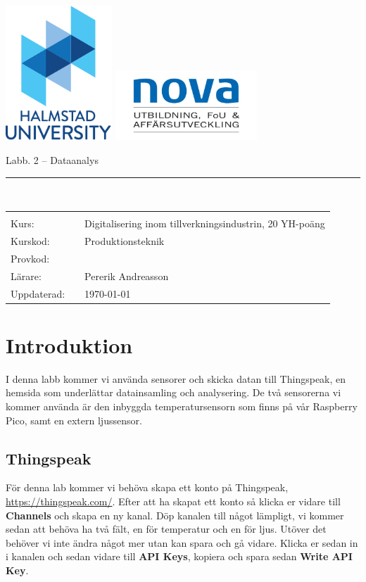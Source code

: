 \documentclass{article}
\newcommand{\kursnamn}{Digitalisering inom tillverknings\-industrin, 20 YH-poäng}
\newcommand{\kurskod}{Produktionsteknik}
\newcommand{\provkod}{}
\begin{document}
  \includegraphics[width=0.3\textwidth]{figures/HH_ENG_color_small.pdf}
  \hspace{3cm}
  \includegraphics[width=0.4\textwidth]{figures/novalogga.jpg}

  \vspace{5mm}
	\begin{center}
	{\Huge{}Labb. 2 -- Dataanalys}
	\end{center}
\noindent\rule{\textwidth}{2pt}
\\


{\Large

\begin{tabular}{p{2cm}p{1cm}p{8cm}}
&  &  \\
Kurs: & 	& 	\kursnamn \\
Kurskod: & & \kurskod \\
Provkod: &  & \provkod \\
L\"arare: &  & Pererik Andreasson \\
Uppdaterad: & & \today
\end{tabular}

}
\pagebreak

\tableofcontents

\section{Introduktion}
I denna labb kommer vi använda sensorer och skicka datan till Thingspeak, en hemsida som underlättar datainsamling och analysering. De två sensorerna vi kommer använda är den inbyggda temperatursensorn som finns på vår Raspberry Pico, samt en extern ljussensor.

\subsection{Thingspeak}
För denna lab kommer vi behöva skapa ett konto på Thingspeak, \url{https://thingspeak.com/}. Efter att ha skapat ett konto så klicka er vidare till \textbf{Channels} och skapa en ny kanal. Döp kanalen till något lämpligt, vi kommer sedan att behöva ha två fält, en för temperatur och en för ljus. Utöver det behöver vi inte ändra något mer utan kan spara och gå vidare. Klicka er sedan in i kanalen och sedan vidare till \textbf{API Keys}, kopiera och spara sedan \textbf{Write API Key}.
\end{document}
